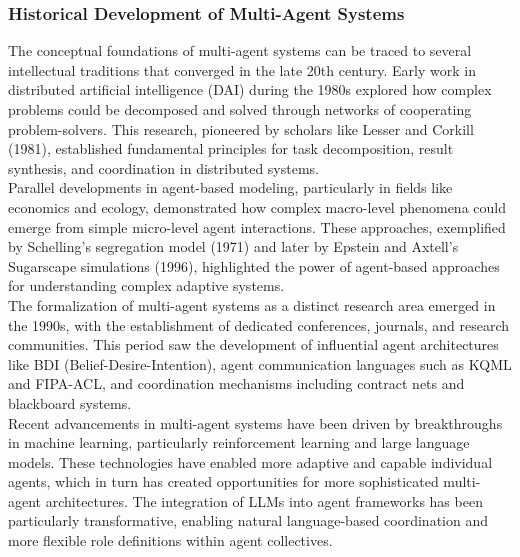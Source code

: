 \subsubsection{Historical Development of Multi-Agent Systems}
The conceptual foundations of multi-agent systems can be traced to several intellectual traditions that converged in the late 20th century. Early work in distributed artificial intelligence (DAI) during the 1980s explored how complex problems could be decomposed and solved through networks of cooperating problem-solvers. This research, pioneered by scholars like Lesser and Corkill (1981), established fundamental principles for task decomposition, result synthesis, and coordination in distributed systems.\\ \newline
Parallel developments in agent-based modeling, particularly in fields like economics and ecology, demonstrated how complex macro-level phenomena could emerge from simple micro-level agent interactions. These approaches, exemplified by Schelling's segregation model (1971) and later by Epstein and Axtell's Sugarscape simulations (1996), highlighted the power of agent-based approaches for understanding complex adaptive systems.\\ \newline
The formalization of multi-agent systems as a distinct research area emerged in the 1990s, with the establishment of dedicated conferences, journals, and research communities. This period saw the development of influential agent architectures like BDI (Belief-Desire-Intention), agent communication languages such as KQML and FIPA-ACL, and coordination mechanisms including contract nets and blackboard systems.\\ \newline
Recent advancements in multi-agent systems have been driven by breakthroughs in machine learning, particularly reinforcement learning and large language models. These technologies have enabled more adaptive and capable individual agents, which in turn has created opportunities for more sophisticated multi-agent architectures. The integration of LLMs into agent frameworks has been particularly transformative, enabling natural language-based coordination and more flexible role definitions within agent collectives.\\
